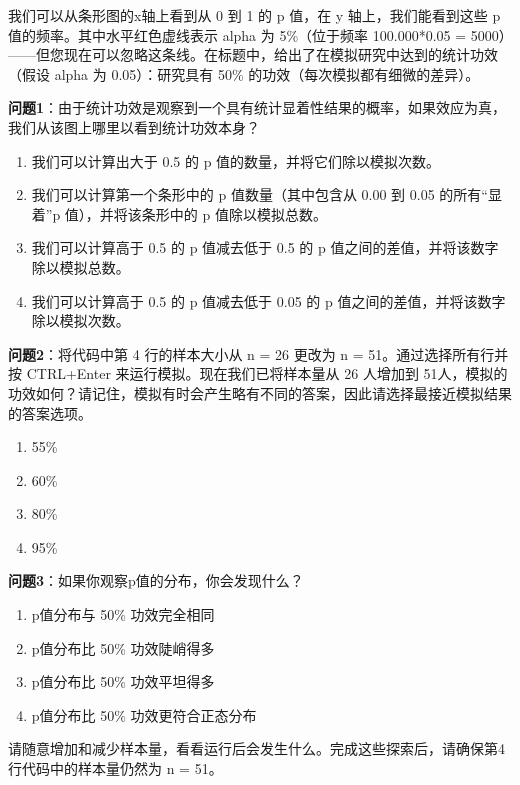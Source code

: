 \documentclass[
  letterpaper,
  DIV=11,
  numbers=noendperiod]{scrreprt}
\providecommand{\tightlist}{%
  \setlength{\itemsep}{0pt}\setlength{\parskip}{0pt}}\usepackage{longtable,booktabs,array}
\begin{document}
我们可以从条形图的x轴上看到从 0 到 1 的 p 值，在 y 轴上，我们能看到这些
p 值的频率。其中水平红色虚线表示 alpha 为 5\%（位于频率 100.000*0.05 =
5000）------但您现在可以忽略这条线。在标题中，给出了在模拟研究中达到的统计功效（假设
alpha 为 0.05）：研究具有 50\% 的功效（每次模拟都有细微的差异）。

\textbf{问题1}：由于统计功效是观察到一个具有统计显着性结果的概率，如果效应为真，我们从该图上哪里以看到统计功效本身？

\begin{enumerate}
\def\labelenumi{\Alph{enumi})}
\tightlist
\item
  我们可以计算出大于 0.5 的 p 值的数量，并将它们除以模拟次数。
\item
  我们可以计算第一个条形中的 p 值数量（其中包含从 0.00 到 0.05
  的所有``显着''p 值），并将该条形中的 p 值除以模拟总数。
\item
  我们可以计算高于 0.5 的 p 值减去低于 0.5 的 p
  值之间的差值，并将该数字除以模拟总数。
\item
  我们可以计算高于 0.5 的 p 值减去低于 0.05 的 p
  值之间的差值，并将该数字除以模拟次数。
\end{enumerate}

\textbf{问题2}：将代码中第 4 行的样本大小从 n = 26 更改为 n =
51。通过选择所有行并按 CTRL+Enter 来运行模拟。现在我们已将样本量从 26
人增加到
51人，模拟的功效如何？请记住，模拟有时会产生略有不同的答案，因此请选择最接近模拟结果的答案选项。

\begin{enumerate}
\def\labelenumi{\Alph{enumi})}
\tightlist
\item
  55\%
\item
  60\%
\item
  80\%
\item
  95\%
\end{enumerate}

\textbf{问题3}：如果你观察p值的分布，你会发现什么？

\begin{enumerate}
\def\labelenumi{\Alph{enumi})}
\tightlist
\item
  p值分布与 50\% 功效完全相同
\item
  p值分布比 50\% 功效陡峭得多
\item
  p值分布比 50\% 功效平坦得多
\item
  p值分布比 50\% 功效更符合正态分布
\end{enumerate}

请随意增加和减少样本量，看看运行后会发生什么。完成这些探索后，请确保第4行代码中的样本量仍然为
n = 51。
\end{document}
